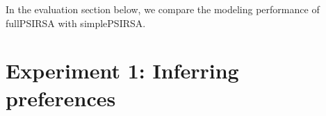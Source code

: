 \documentclass[11pt,a4paper]{article}
\begin{document}
In the evaluation section below, we compare the modeling performance of fullPSIRSA with simplePSIRSA. 











\section{Experiment 1: Inferring preferences}
\end{document}
